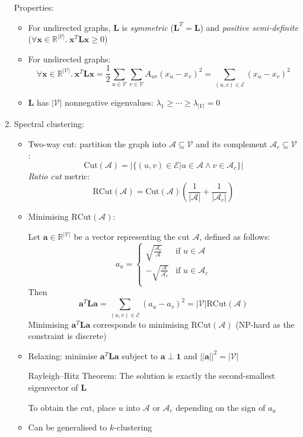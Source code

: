 \documentclass{article}
\begin{document}
\begin{enumerate}
	Properties:
	\begin{itemize}[topsep=0pt]
		\item For undirected graphs, $\mathbf{L}$ is \textit{symmetric} ($\mathbf{L}^T=\mathbf{L}$) and \textit{positive semi-definite} ($\forall\mathbf{x}\in\mathbb{R}^{|\mathcal{V}|}.\ \mathbf{x}^T\mathbf{L}\mathbf{x}\geq0$)
		\item For undirected graphs:
		$$\forall \mathbf{x}\in\mathbb{R}^{|\mathcal{V}|}.\ \mathbf{x}^T\mathbf{L}\mathbf{x}=\frac{1}{2}\sum_{u\in\mathcal{V}}\sum_{v\in\mathcal{V}}A_{uv}(x_u-x_v)^2=\sum_{(u,v)\in\mathcal{E}}(x_u-x_v)^2$$
		\item $\mathbf{L}$ has $|\mathcal{V}|$ nonnegative eigenvalues: $\lambda_1\geq\cdots\geq\lambda_{|V|}=0$
	\end{itemize}
	\newpage
	\item Spectral clustering:
	\begin{itemize}[topsep=0pt]
		\item Two-way cut: partition the graph into $\mathcal{A}\subseteq\mathcal{V}$ and its complement $\mathcal{A}_c\subseteq\mathcal{V}$:
		$$\text{Cut}(\mathcal{A})=\left|\big\{(u, v)\in\mathcal{E}\big|u\in\mathcal{A}\wedge v\in\mathcal{A}_c\big\}\right|$$
		\textit{Ratio cut} metric:
		$$\text{RCut}(\mathcal{A})=\text{Cut}(\mathcal{A})\left(\frac{1}{|\mathcal{A}|}+\frac{1}{|\mathcal{A}_c|}\right)$$
		\item Minimising $\text{RCut}(\mathcal{A})$:
		
		Let $\mathbf{a}\in\mathbb{R}^{|\mathcal{V}|}$ be a vector representing the cut $\mathcal{A}$, defined as follows:
		$$a_u=\begin{cases}
			\sqrt{\frac{\mathcal{A}_c}{\mathcal{A}}} &\text{if }u\in\mathcal{A}\\
			-\sqrt{\frac{\mathcal{A}}{\mathcal{A}_c}} &\text{if }u\in\mathcal{A}_c\\
		\end{cases}$$
		Then
		$$\mathbf{a}^T\mathbf{L}\mathbf{a}=\sum_{(u,v)\in\mathcal{E}}(a_u-a_v)^2=|\mathcal{V}|\text{RCut}(\mathcal{A})$$
		Minimising $\mathbf{a}^T\mathbf{L}\mathbf{a}$ corresponds to minimising $\text{RCut}(\mathcal{A})$ (NP-hard as the constraint is discrete)
		\item Relaxing: minimise $\mathbf{a}^T\mathbf{L}\mathbf{a}$ subject to $\mathbf{a}\perp\mathbf{1}$ and $||\mathbf{a}||^2=|\mathcal{V}|$
		
		Rayleigh--Ritz Theorem: The solution is exactly the second-smallest eigenvector of $\mathbf{L}$
		
		To obtain the cut, place $u$ into $\mathcal{A}$ or $\mathcal{A}_c$ depending on the sign of $a_u$
		\item Can be generalised to $k$-clustering 
	\end{itemize}
\end{enumerate}
\end{document}

